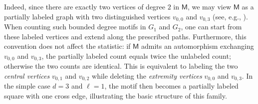 \documentclass[letterpaper,11pt]{article}
\theoremstyle{definition}
\newcommand{\nbr}[1]{{\sf\color{red}[#1]}}
\newcommand{\sfM}{{\mathsf{M}}}
\begin{document}
Indeed, since there are exactly two vertices of degree $2$ in $\sfM$, we may view $\sfM$ as a partially labeled graph with two distinguished vertices $v_{0,0}$ and $v_{0,3}$ (see, e.g., \citep[Section~3.2]{lovasz2012large}). When counting such bounded degree motifs in $G_1$ and $G_2$, one can start from these labeled vertices and extend along the prescribed paths.
Furthermore, this convention does not affect the statistic: if $\sfM$ admits an automorphism exchanging $v_{0,0}$ and $v_{0,3}$, the partially labeled count equals twice the unlabeled count; otherwise the two counts are identical.
This is equivalent to labeling the two \emph{central vertices} $v_{0,1}$ and $v_{0,2}$ while deleting the \emph{extremity vertices} $v_{0,0}$ and $v_{0,3}$. In the simple case $d=3$ and $\ell=1$, the motif then becomes a partially labeled square with one cross edge, illustrating the basic structure of this family.


\end{document}
